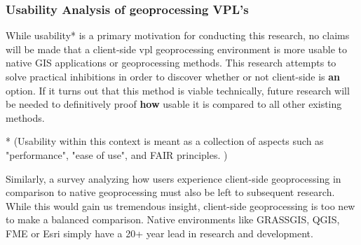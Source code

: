 \subsubsection*{Usability Analysis of geoprocessing VPL's} %

While usability* is a primary motivation for conducting this research, no claims will be made that a client-side vpl geoprocessing environment is more usable to native GIS applications or geoprocessing methods. This research attempts to solve practical inhibitions in order to discover whether or not client-side is \textbf{an} option. If it turns out that this method is viable technically, future research will be needed to definitively proof \textbf{how} usable it is compared to all other existing methods.  


* (Usability within this context is meant as a collection of aspects such as "performance", "ease of use", and FAIR principles. )

Similarly, a survey analyzing how users experience client-side geoprocessing in comparison to native geoprocessing must also be left to subsequent research. While this would gain us tremendous insight, client-side geoprocessing is too new to make a balanced comparison. Native environments like GRASSGIS, QGIS, FME or Esri simply have a 20+ year lead in research and development. 







